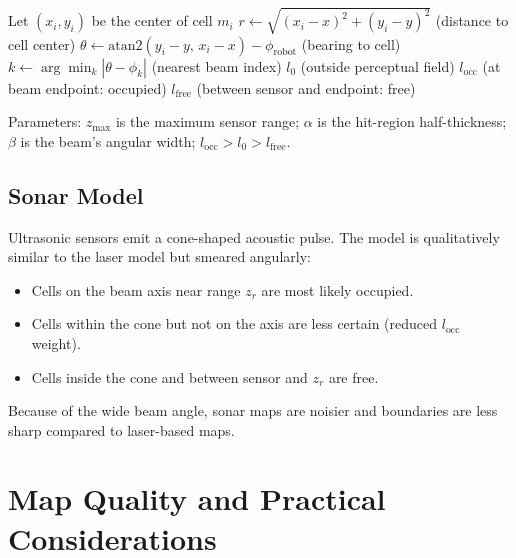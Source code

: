 \documentclass[11pt,a4paper]{article}
\theoremstyle{definition}
\theoremstyle{plain}
\theoremstyle{remark}
\begin{document}
\begin{algorithm}
\caption{Inverse Range Sensor Model (Laser)}
\begin{algorithmic}
\STATE Let $(x_i, y_i)$ be the center of cell $m_i$
\STATE $r \leftarrow \sqrt{(x_i - x)^2 + (y_i - y)^2}$ \hfill (distance to cell center) %
\STATE $\theta \leftarrow \mathrm{atan2}(y_i - y,\, x_i - x) - \phi_\mathrm{robot}$ \hfill (bearing to cell)
\STATE $k \leftarrow \arg\min_k |\theta - \phi_k|$ \hfill (nearest beam index)
    \RETURN $l_0$ \hfill (outside perceptual field)
\ENDIF
{} %
    \RETURN $l_\mathrm{occ}$ \hfill (at beam endpoint: occupied)
\ENDIF
{}
    \RETURN $l_\mathrm{free}$ \hfill (between sensor and endpoint: free)
\ENDIF
\end{algorithmic}
\end{algorithm}

Parameters: $z_\mathrm{max}$ is the maximum sensor range; $\alpha$ is the hit-region half-thickness; $\beta$ is the beam's angular width; $l_\mathrm{occ} > l_0 > l_\mathrm{free}$. %

\subsection{Sonar Model}

Ultrasonic sensors emit a cone-shaped acoustic pulse. The model is qualitatively similar to the laser model but smeared angularly:

\begin{itemize}
    \item Cells on the beam axis near range $z_r$ are most likely occupied.
    \item Cells within the cone but not on the axis are less certain (reduced $l_\mathrm{occ}$ weight).
    \item Cells inside the cone and between sensor and $z_r$ are free.
\end{itemize}

Because of the wide beam angle, sonar maps are noisier and boundaries are less sharp compared to laser-based maps.

\section{Map Quality and Practical Considerations}
\end{document}

